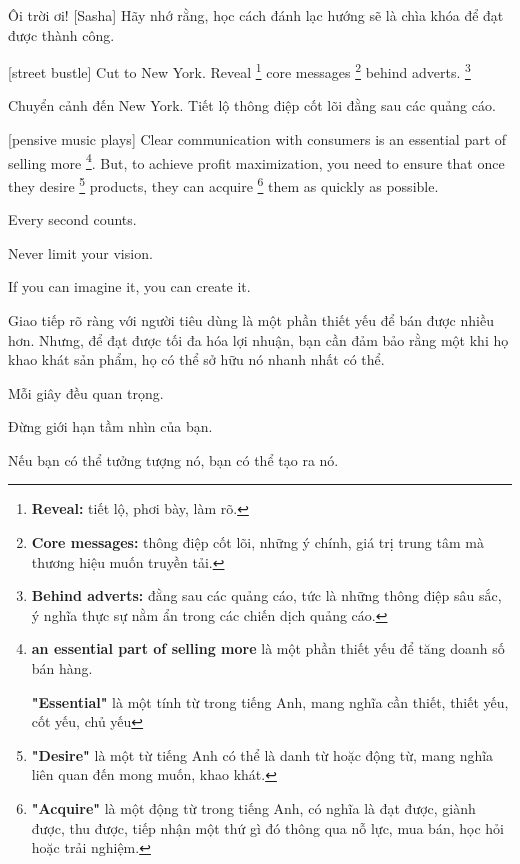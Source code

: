 \documentclass[a4paper]{article}
\begin{document}
	\begin{vietnamese-v2}
		 Ôi trời ơi! 
		[Sasha] Hãy nhớ rằng, học cách đánh lạc hướng sẽ là chìa khóa để đạt được thành công.
	\end{vietnamese-v2}
	
	
	[street bustle]
	Cut to New York. Reveal \footnote{
		\textbf{Reveal:} tiết lộ, phơi bày, làm rõ.
	
	} core messages \footnote{
		\textbf{Core messages:} thông điệp cốt lõi, những ý chính, giá trị trung tâm mà thương hiệu muốn truyền tải.
	
	} behind adverts. \footnote{
		\textbf{Behind adverts:} đằng sau các quảng cáo, tức là những thông điệp sâu sắc, ý nghĩa thực sự nằm ẩn trong các chiến dịch quảng cáo.
	
	}
	
	\begin{vietnamese-v2}
		Chuyển cảnh đến New York. Tiết lộ thông điệp cốt lõi đằng sau các quảng cáo.
	\end{vietnamese-v2}
	
	[pensive music plays]
	Clear communication with consumers is an essential part of selling more \footnote{
		\textbf{an essential part of selling more} là một phần thiết yếu để tăng doanh số bán hàng.
		
		\textbf{"Essential"} là một tính từ trong tiếng Anh, mang nghĩa cần thiết, thiết yếu, cốt yếu, chủ yếu 
	}. But, to achieve profit maximization, you need to ensure that once they desire \footnote{
		\textbf{"Desire"} là một từ tiếng Anh có thể là danh từ hoặc động từ, mang nghĩa liên quan đến mong muốn, khao khát.
	
	} products, they can acquire \footnote{
		\textbf{"Acquire"} là một động từ trong tiếng Anh, có nghĩa là đạt được, giành được, thu được, tiếp nhận một thứ gì đó thông qua nỗ lực, mua bán, học hỏi hoặc trải nghiệm.
	
	} them as quickly as possible.
	
	Every second counts.
	
	Never limit your vision.
	
	If you can imagine it, you can create it.
	
	\begin{vietnamese-v2}
		 Giao tiếp rõ ràng với người tiêu dùng là một phần thiết yếu để bán được nhiều hơn. Nhưng, để đạt được tối đa hóa lợi nhuận, bạn cần đảm bảo rằng một khi họ khao khát sản phẩm, họ có thể sở hữu nó nhanh nhất có thể. 
		
		Mỗi giây đều quan trọng. 
	
		Đừng giới hạn tầm nhìn của bạn. 
	
		Nếu bạn có thể tưởng tượng nó, bạn có thể tạo ra nó.
	\end{vietnamese-v2}
	
\end{document}
